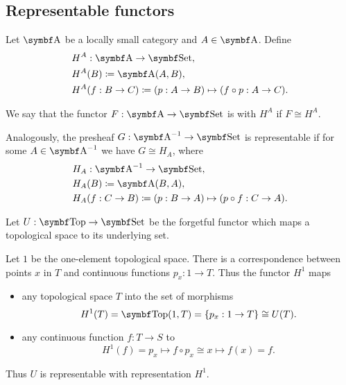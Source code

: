 \subsection{Representable functors}\label{subsec:representable_functors}

\begin{Definition}\label{def:representable_functor}\cite[definitions 4.1.3, 4.1.16]{Leinster2014}
  Let \( \Cat{A} \) be a locally small category and \( A \in \Cat{A} \). Define
  \begin{align*}
    &H^A: \Cat{A} \to \Cat{Set}, \\
    &H^A(B) \coloneqq \Cat{A}(A, B), \\
    &H^A(f: B \to C) \coloneqq (p: A \to B) \mapsto (f \circ p: A \to C).
  \end{align*}

  We say that the functor \( F: \Cat{A} \to \Cat{Set} \) is  with  \( H^A \) if \( F \cong H^A \).

  Analogously, the presheaf \( G: \Cat{A}^{-1} \to \Cat{Set} \) is representable if for some \( A \in \Cat{A}^{-1} \) we have \( G \cong H_A \), where
  \begin{align*}
    &H_A: \Cat{A}^{-1} \to \Cat{Set}, \\
    &H_A(B) \coloneqq \Cat{A}(B, A), \\
    &H_A(f: C \to B) \coloneqq (p: B \to A) \mapsto (p \circ f: C \to A).
  \end{align*}
\end{Definition}

\begin{Example}\label{def:top_representable_functor}\cite[example 4.1.4]{Leinster2014}
  Let \( U: \Cat{Top} \to \Cat{Set} \) be the forgetful functor which maps a topological space to its underlying set.

  Let \( 1 \) be the one-element topological space. There is a correspondence between points \( x \) in \( T \) and continuous functions \( p_x: 1 \to T \). Thus the functor \( H^1 \) maps
  \begin{itemize}
    \item any topological space \( T \) into the set of morphisms
    \begin{equation*}
      H^1(T) = \Cat{Top}(1, T) = \{ p_x: 1 \to T \} \cong U(T).
    \end{equation*}
    \item any continuous function \( f: T \to S \) to
    \begin{equation*}
      H^1(f) = p_x \mapsto f \circ p_x \cong x \mapsto f(x) = f.
    \end{equation*}
  \end{itemize}

  Thus \( U \) is representable with representation \( H^1 \).
\end{Example}

